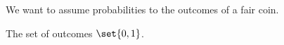 

We want to assume probabilities
to the outcomes of a fair coin.


The set of outcomes $\set{0, 1}$.

